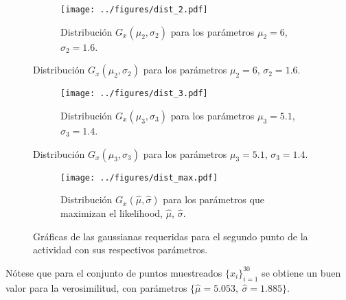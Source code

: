 \begin{enumerate}
\begin{solution}
\begin{figure}[H]
        \end{figure}
        \begin{figure}[H]
            \ContinuedFloat
            \begin{subfigure}{\textwidth}
                \centering
                \texttt{[image: ../figures/dist\_2.pdf]}
                \caption{Distribución $G_{x}(\mu_2, \sigma_2)$ para los parámetros $\mu_2 = 6$, $\sigma_2 = 1.6$.}
                \label{fig:gaussiana_2}
            \end{subfigure}
        \end{figure}
        \begin{figure}[H]
            \ContinuedFloat
            \begin{subfigure}{\textwidth}
                \centering
                \texttt{[image: ../figures/dist\_3.pdf]}
                \caption{Distribución $G_{x}(\mu_3, \sigma_3)$ para los parámetros $\mu_3 = 5.1$, $\sigma_3 = 1.4$.}
                \label{fig:gaussiana_3}
            \end{subfigure}
        \end{figure}
        \begin{figure}[H]
            \ContinuedFloat
            \begin{subfigure}{\textwidth}
                \centering
                \texttt{[image: ../figures/dist\_max.pdf]}
                \caption{Distribución $G_{x}(\hat{\mu}, \hat{\sigma})$ para los parámetros que maximizan el likelihood, $\hat{\mu}$, $\hat{\sigma}$.}
                \label{fig:gaussiana_max}
            \end{subfigure}
            \caption{Gráficas de las gaussianas requeridas para el segundo punto de la actividad con sus respectivos parámetros.}
            \label{fig:gaussianas}
        \end{figure}

        Nótese que para el conjunto de puntos muestreados $\{x_i\}_{i=1}^{30}$ se obtiene un buen valor para la verosimilitud, con parámetros $\{\hat{\mu} = 5.053,\ \hat{\sigma} = 1.885\}$.


\end{solution}
\end{enumerate}
